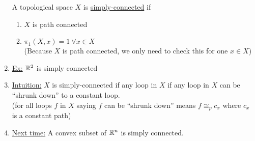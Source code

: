 \begin{enumerate}
            \begin{definition} A topological space $X$ is \underline{simply-connected} if
            \begin{enumerate}
                \item $X$ is path connected
                \item $\pi_1(X,x)={1}\ \forall x\in X$\\
                    (Because $X$ is path connected, we only need to check this for one $x\in X$)
            \end{enumerate}
            \end{definition}
        \item \underline{Ex:} $\mathbb{R}^2$ is simply connected
        \item \underline{Intuition:} $X$ is simply-connected if any loop in $X$ if any loop in $X$ can
            be ``shrunk down'' to a constant loop.\\
            (for all loops $f$ in $X$ saying $f$ can be ``shrunk down'' means $f\cong_{p}c_x$ where $c_x$ is a constant path)
        \item \underline{Next time:} A convex subset of $\mathbb{R}^n$ is simply connected.
    \end{enumerate}
